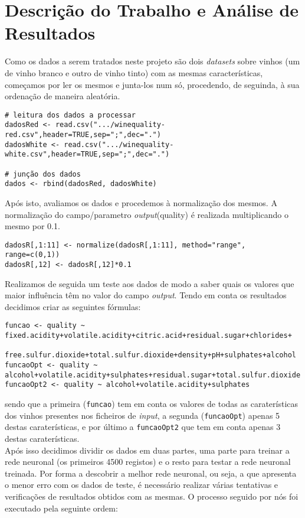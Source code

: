 \documentclass{article}
\begin{document}
\section{Descrição do Trabalho e Análise de Resultados}

Como os dados a serem tratados neste projeto são dois \textit{datasets} sobre vinhos (um de vinho branco e outro de vinho tinto) com as mesmas características, começamos por ler os mesmos e junta-los num só, procedendo, de seguinda, à sua ordenação de maneira aleatória.

\begin{verbatim}
# leitura dos dados a processar
dadosRed <- read.csv(".../winequality-red.csv",header=TRUE,sep=";",dec=".")
dadosWhite <- read.csv(".../winequality-white.csv",header=TRUE,sep=";",dec=".")

# junção dos dados
dados <- rbind(dadosRed, dadosWhite)
\end{verbatim}

Após isto, avaliamos os dados e procedemos à normalização dos mesmos. A normalização do campo/parametro \textit{output}(quality) é realizada multiplicando o mesmo por 0.1.

\begin{verbatim}
dadosR[,1:11] <- normalize(dadosR[,1:11], method="range", range=c(0,1))
dadosR[,12] <- dadosR[,12]*0.1
\end{verbatim}

Realizamos de seguida um teste aos dados de modo a saber quais os valores que maior influência têm no valor do campo \textit{output}. Tendo em conta os resultados decidimos criar as seguintes fórmulas:

\begin{verbatim}
funcao <- quality ~ fixed.acidity+volatile.acidity+citric.acid+residual.sugar+chlorides+
                    free.sulfur.dioxide+total.sulfur.dioxide+density+pH+sulphates+alcohol
funcaoOpt <- quality ~ alcohol+volatile.acidity+sulphates+residual.sugar+total.sulfur.dioxide
funcaoOpt2 <- quality ~ alcohol+volatile.acidity+sulphates
\end{verbatim}

sendo que a primeira (\texttt{funcao}) tem em conta os valores de todas as caraterísticas dos vinhos presentes nos ficheiros de \textit{input}, a segunda (\texttt{funcaoOpt}) apenas 5 destas caraterísticas, e por último a \texttt{funcaoOpt2} que tem em conta apenas 3 destas caraterísticas.\\
Após isso decidimos dividir os dados em duas partes, uma parte para treinar a rede neuronal (os primeiros 4500 registos) e o resto para testar a rede neuronal treinada.
Por forma a descobrir a melhor rede neuronal, ou seja, a que apresenta o menor erro com os dados de teste, é necessário realizar várias tentativas e verificações de resultados obtidos com as mesmas. O processo seguido por nós foi executado pela seguinte ordem:
\end{document}
